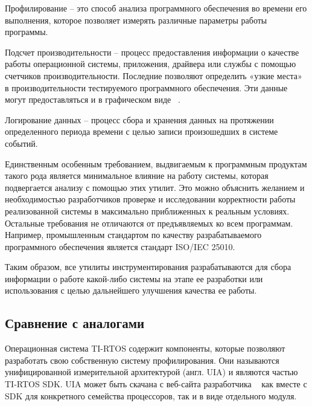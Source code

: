 Профилирование -- это способ анализа программного обеспечения во времени
его выполнения, которое позволяет измерять различные параметры работы программы.

Подсчет производительности -- процесс предоставления информации о качестве
работы операционной системы, приложения, драйвера или службы с помощью
счетчиков производительности. Последние позволяют определить «узкие места»
в производительности тестируемого программного обеспечения. Эти данные
могут предоставляться и в графическом виде ~\cite{perfomance_counters_site}.

Логирование данных -- процесс сбора и хранения данных на протяжении определенного
периода времени с целью записи произошедших в системе событий.

Единственным особенным требованием, выдвигаемым к программным продуктам
такого рода является минимальное влияние на работу системы, которая подвергается
анализу с помощью этих утилит. Это можно объяснить желанием и необходимостью
разработчиков проверке и исследовании корректности работы реализованной системы
в максимально приближенных к реальным условиях. Остальные требования не отличаются
от предъявляемых ко всем программам. Например, промышленным стандартом
по качеству разрабатываемого программного обеспечения является стандарт
ISO/IEC 25010.

Таким образом, все утилиты инструментирования разрабатываются для сбора
информации о работе какой-либо системы на этапе ее разработки или использования
с целью дальнейшего улучшения качества ее работы.

\subsection{Сравнение с аналогами}


Операционная система TI-RTOS содержит компоненты, которые позволяют
разработать свою собственную систему профилирования. Они называются
унифицированной измерительной архитектурой (англ. UIA) и являются частью
TI-RTOS SDK. UIA может быть скачана с веб-сайта разработчика ~\cite{uia_wiki}
как вместе с SDK для конкретного семейства процессоров, так и в виде отдельного
модуля.

